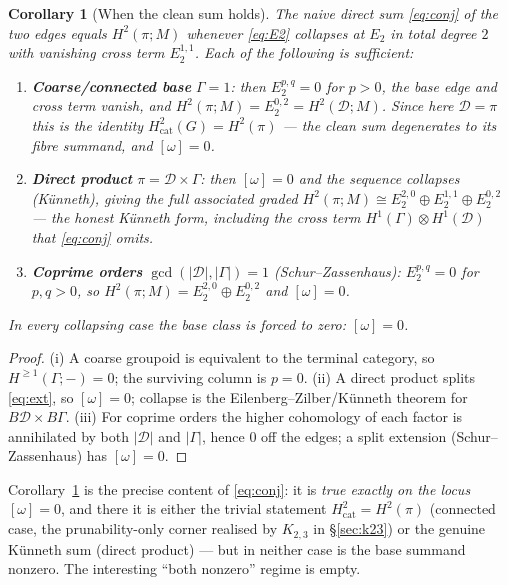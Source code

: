 \documentclass[11pt]{article}
\newtheorem{corollary}[theorem]{Corollary}
\theoremstyle{definition}
\newcommand{\D}{\mathcal{D}}
\begin{document}
\begin{corollary}[When the clean sum holds]\label{cor:collapse}
The naive direct sum \eqref{eq:conj} of the two edges equals $H^2(\pi;M)$ whenever
\eqref{eq:E2} collapses at $E_2$ in total degree $2$ with vanishing cross term $E_2^{1,1}$.
Each of the following is sufficient:
\begin{enumerate}
\item[\textup{(i)}] \textbf{Coarse/connected base} $\Gamma=1$: then $E_2^{p,q}=0$ for $p>0$,
the base edge and cross term vanish, and $H^2(\pi;M)=E_2^{0,2}=H^2(\D;M)$. Since here
$\D=\pi$ this is the identity $H^2_{\mathrm{cat}}(G)=H^2(\pi)$ --- the clean sum degenerates
to its fibre summand, and $[\omega]=0$.
\item[\textup{(ii)}] \textbf{Direct product} $\pi=\D\times\Gamma$: then $[\omega]=0$ and the
sequence collapses (K\"unneth), giving the \emph{full} associated graded $H^2(\pi;M)\cong
E_2^{2,0}\oplus E_2^{1,1}\oplus E_2^{0,2}$ --- the honest K\"unneth form, including the cross
term $H^1(\Gamma)\otimes H^1(\D)$ that \eqref{eq:conj} omits.
\item[\textup{(iii)}] \textbf{Coprime orders} $\gcd(|\D|,|\Gamma|)=1$ (Schur--Zassenhaus):
$E_2^{p,q}=0$ for $p,q>0$, so $H^2(\pi;M)=E_2^{2,0}\oplus E_2^{0,2}$ and $[\omega]=0$.
\end{enumerate}
In every collapsing case the base class is forced to zero: $[\omega]=0$.
\end{corollary}
\begin{proof}
(i) A coarse groupoid is equivalent to the terminal category, so $H^{\ge1}(\Gamma;-)=0$; the
surviving column is $p=0$. (ii) A direct product splits \eqref{eq:ext}, so $[\omega]=0$;
collapse is the Eilenberg--Zilber/K\"unneth theorem for $B\D\times B\Gamma$. (iii) For coprime
orders the higher cohomology of each factor is annihilated by both $|\D|$ and $|\Gamma|$,
hence $0$ off the edges; a split extension (Schur--Zassenhaus) has $[\omega]=0$.
\end{proof}

Corollary~\ref{cor:collapse} is the precise content of \eqref{eq:conj}: it is \emph{true
exactly on the locus $[\omega]=0$}, and there it is either the trivial statement
$H^2_{\mathrm{cat}}=H^2(\pi)$ (connected case, the prunability-only corner realised by
$K_{2,3}$ in \S\ref{sec:k23}) or the genuine K\"unneth sum (direct product) --- but in
neither case is the base summand nonzero. The interesting ``both nonzero'' regime is empty.
\end{document}
